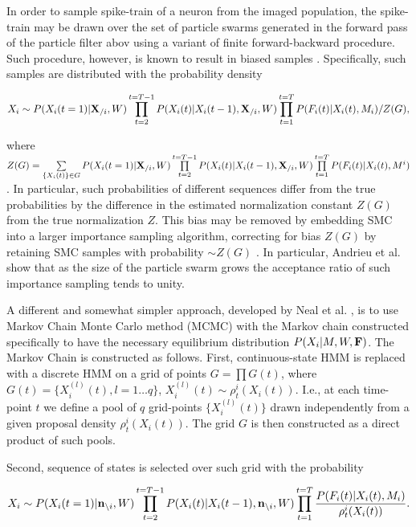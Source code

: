 In order to sample spike-train of a neuron from the imaged population, the spike-train may be drawn over the set of particle swarms generated in the forward pass of the particle filter abov using a variant of finite forward-backward procedure.  Such procedure, however, is known to result in biased samples \cite{Andrieu2007, NBR03}.
Specifically, such samples are distributed with the probability density

\begin{equation}
X_i \sim P(X_i(t=1)|{\bf X}_{/i}, W)\prod\limits_{t=2}^{t=T-1}P(X_i(t)|X_i(t-1), {\bf X}_{/i}, W)\prod\limits_{t=1}^{t=T}P(F_i(t)|X_i(t), M_i)/Z(G), 
\end{equation}

where $Z(G)=\sum\limits_{\{X_i(t)\}\in G}P(X_i(t=1)|{\bf X}_{/i}, W)\prod\limits_{t=2}^{t=T-1}P(X_i(t)|X_i(t-1), {\bf X}_{/i}, W) \prod\limits_{t=1}^{t=T}P(F_i(t)|X_i(t), M^i)$.  In particular, such probabilities of different sequences differ from the true probabilities by the difference in the estimated normalization constant $Z(G)$ from the true normalization $Z$.  This bias may be removed by embedding SMC into a larger importance sampling algorithm, correcting for bias $Z(G)$ by retaining SMC samples with probability $\sim Z(G)$ \cite{Andrieu2007}. In particular, Andrieu et al. \cite{Andrieu2007} show that as the size of the particle swarm grows the acceptance ratio of such importance sampling tends to unity.

A different and somewhat simpler approach, developed by Neal et al. \cite{NBR03}, is to use Markov Chain Monte Carlo method (MCMC) with the Markov chain constructed specifically to have the necessary equilibrium distribution $P(X_i|M, W, {\bf F})$. The Markov Chain is constructed as follows. First, continuous-state HMM is replaced with a discrete HMM on a grid of points $G=\prod G(t)$, where $G(t) = \{X_i^{(l)}(t), l=1\ldots q\}$, $X_i^{(l)}(t)\sim \rho^i_t(X_i(t))$. I.e., at each time-point $t$ we define a pool of $q$ grid-points $\{X_i^{(l)}(t)\}$ drawn independently from a given proposal density $\rho^i_t(X_i(t))$. The grid $G$ is then constructed as a direct product of such pools.

Second, sequence of states is selected over such grid with the probability

\begin{equation}\label{eqn:nealprob}
X_i\sim P(X_i(t=1)|{\bf n}_{\backslash i}, W)\prod\limits_{t=2}^{t=T-1}P(X_i(t)|X_i(t-1), {\bf n}_{\backslash i}, W)\prod\limits_{t=1}^{t=T}
\frac{P(F_i(t)|X_i(t), M_i)}{\rho^i_t(X_i(t))}.
\end{equation}

